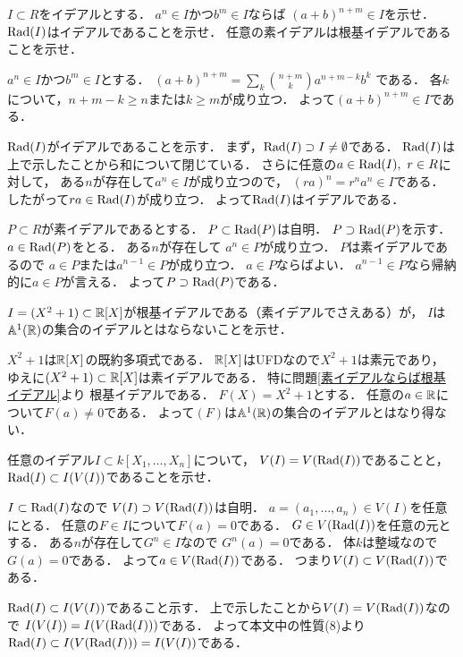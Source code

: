 \begin{prob}\label{素イデアルならば根基イデアル}
  $I\subset R$をイデアルとする．
  $a^n \in I$かつ$b^m\in I$ならば
  $(a+b)^{n+m} \in I$を示せ．
  $\mathrm{Rad}(I)$はイデアルであることを示せ．
  任意の素イデアルは根基イデアルであることを示せ．
\end{prob}
\begin{ans}
  $a^n \in I$かつ$b^m\in I$とする．
  $(a+b)^{n+m} = \sum_{k} \binom{n+m}{k} a^{n+m-k}b^k$
  である．
  各$k$について，$n+m-k \ge n$または$k \ge m$が成り立つ．
  よって$(a+b)^{n+m} \in I$である．

  $\mathrm{Rad}(I)$がイデアルであることを示す．
  まず，$\mathrm{Rad}(I) \supset I \ne \emptyset $である．
  $\mathrm{Rad}(I)$は上で示したことから和について閉じている．
  さらに任意の$a \in \mathrm{Rad}(I), \ r\in R$に対して，
  ある$n$が存在して$ a^n \in I$が成り立つので，
  $ (ra)^n = r^n a^n \in I $である．
  したがって$ra \in \mathrm{Rad}(I)$が成り立つ．
  よって$\mathrm{Rad}(I)$はイデアルである．

  $P\subset R$が素イデアルであるとする．
  $P \subset \mathrm{Rad}(P)$は自明．
  $P \supset \mathrm{Rad}(P)$を示す．
  $ a\in \mathrm{Rad}(P)$をとる．
  ある$n$が存在して
  $ a^n \in P$が成り立つ．
  $P$は素イデアルであるので
  $a\in P$または$a^{n-1} \in P$が成り立つ．
  $a\in P$ならばよい．
  $a^{n-1} \in P$なら帰納的に$a\in P$が言える．
  よって$P \supset \mathrm{Rad}(P)$である．
\end{ans}

\begin{prob}
  $I = (X^2 + 1) \subset \mathbb{R}[X]$が根基イデアルである（素イデアルでさえある）が，
  $I$は$\mathbb{A}^1(\mathbb{R})$の集合のイデアルとはならないことを示せ．
\end{prob}
\begin{ans}
  $X^2 + 1$は$\mathbb{R}[X]$の既約多項式である．
  $\mathbb{R}[X]$はUFDなので$X^2+1$は素元であり，
  ゆえに$(X^2+1) \subset \mathbb{R}[X]$は素イデアルである．
  特に問題\ref{素イデアルならば根基イデアル}より
  根基イデアルである．
  $F(X) = X^2 + 1$とする．
  任意の$a \in \mathbb{R}$について$F(a) \ne 0$である．
  よって$(F)$は$\mathbb{A}^1(\mathbb{R})$の集合のイデアルとはなり得ない．
\end{ans}

\begin{prob}
  任意のイデアル$I \subset k[X_1,\dots,X_n]$について，
  $V(I) = V(\mathrm{Rad}(I))$であることと，
  $\mathrm{Rad}(I) \subset I(V(I))$であることを示せ．
\end{prob}
\begin{ans}
  $I \subset \mathrm{Rad}(I)$なので
  $V(I) \supset V(\mathrm{Rad}(I))$は自明．
  $a = (a_1, \dots , a_n) \in V(I)$を任意にとる．
  任意の$F\in I$について$F(a) = 0$である．
  $G \in V(\mathrm{Rad}(I))$を任意の元とする．
  ある$n$が存在して$G^n \in I$なので
  $G^n(a) = 0$である．
  体$k$は整域なので$G(a) = 0$である．
  よって$a \in V(\mathrm{Rad}(I))$である．
  つまり$V(I) \subset V(\mathrm{Rad}(I))$である．

  $\mathrm{Rad}(I) \subset I(V(I))$であること示す．
  上で示したことから$V(I) = V(\mathrm{Rad}(I))$なので
  $I(V(I)) = I(V(\mathrm{Rad}(I)))$である．
  よって本文中の性質(8)より
  $\mathrm{Rad}(I) \subset I(V(\mathrm{Rad}(I))) = I(V(I))$である．
\end{ans}


